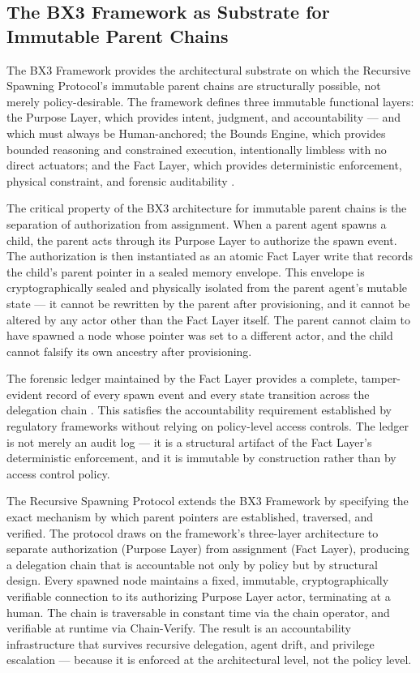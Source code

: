 \subsection{The BX3 Framework as Substrate for Immutable Parent Chains}
\label{sec:bx3-substrate}

The BX3 Framework provides the architectural substrate on which the Recursive Spawning Protocol's immutable parent chains are structurally possible, not merely policy-desirable. The framework defines three immutable functional layers: the Purpose Layer, which provides intent, judgment, and accountability — and which must always be Human-anchored; the Bounds Engine, which provides bounded reasoning and constrained execution, intentionally limbless with no direct actuators; and the Fact Layer, which provides deterministic enforcement, physical constraint, and forensic auditability \cite{bx3whitepaper2026,bx3universal2026}.

The critical property of the BX3 architecture for immutable parent chains is the separation of authorization from assignment. When a parent agent spawns a child, the parent acts through its Purpose Layer to authorize the spawn event. The authorization is then instantiated as an atomic Fact Layer write that records the child's parent pointer in a sealed memory envelope. This envelope is cryptographically sealed and physically isolated from the parent agent's mutable state — it cannot be rewritten by the parent after provisioning, and it cannot be altered by any actor other than the Fact Layer itself. The parent cannot claim to have spawned a node whose pointer was set to a different actor, and the child cannot falsify its own ancestry after provisioning.

The forensic ledger maintained by the Fact Layer provides a complete, tamper-evident record of every spawn event and every state transition across the delegation chain \cite{bx3whitepaper2026}. This satisfies the accountability requirement established by regulatory frameworks without relying on policy-level access controls. The ledger is not merely an audit log — it is a structural artifact of the Fact Layer's deterministic enforcement, and it is immutable by construction rather than by access control policy.

The Recursive Spawning Protocol extends the BX3 Framework by specifying the exact mechanism by which parent pointers are established, traversed, and verified. The protocol draws on the framework's three-layer architecture to separate authorization (Purpose Layer) from assignment (Fact Layer), producing a delegation chain that is accountable not only by policy but by structural design. Every spawned node maintains a fixed, immutable, cryptographically verifiable connection to its authorizing Purpose Layer actor, terminating at a human. The chain is traversable in constant time via the chain operator, and verifiable at runtime via Chain-Verify. The result is an accountability infrastructure that survives recursive delegation, agent drift, and privilege escalation — because it is enforced at the architectural level, not the policy level.

